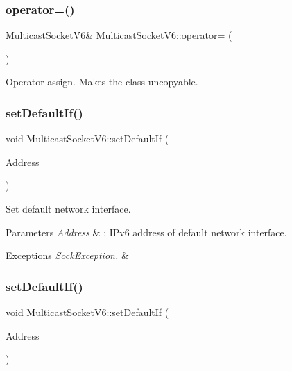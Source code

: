 \subsubsection{\texorpdfstring{operator=()}{operator=()}}
{\footnotesize\ttfamily \hyperlink{classMulticastSocketV6}{Multicast\+Socket\+V6}\& Multicast\+Socket\+V6\+::operator= (\begin{DoxyParamCaption}\item[{\hyperlink{classMulticastSocketV6}{Multicast\+Socket\+V6} \&}]{ }\end{DoxyParamCaption})\hspace{0.3cm}{\ttfamily [private]}}

Operator assign. Makes the class uncopyable. \mbox{\label{classMulticastSocketV6_a79e2bd2544a73c01cc7e8c8b998da4e1}} 
\subsubsection{\texorpdfstring{set\+Default\+If()}{setDefaultIf()}\hspace{0.1cm}{\footnotesize\ttfamily [1/3]}}
{\footnotesize\ttfamily void Multicast\+Socket\+V6\+::set\+Default\+If (\begin{DoxyParamCaption}\item[{in6\+\_\+addr}]{Address }\end{DoxyParamCaption})}

Set default network interface. 
\begin{DoxyParams}{Parameters}
{\em Address} & \+: I\+Pv6 address of default network interface. \\
\hline
\end{DoxyParams}

\begin{DoxyExceptions}{Exceptions}
{\em Sock\+Exception.} & \\
\hline
\end{DoxyExceptions}
\mbox{\label{classMulticastSocketV6_ad7534d71b628f9be4af98161cd35bdf9}} 
\subsubsection{\texorpdfstring{set\+Default\+If()}{setDefaultIf()}\hspace{0.1cm}{\footnotesize\ttfamily [2/3]}}
{\footnotesize\ttfamily void Multicast\+Socket\+V6\+::set\+Default\+If (\begin{DoxyParamCaption}\item[{const char $\ast$}]{Address }\end{DoxyParamCaption})}

